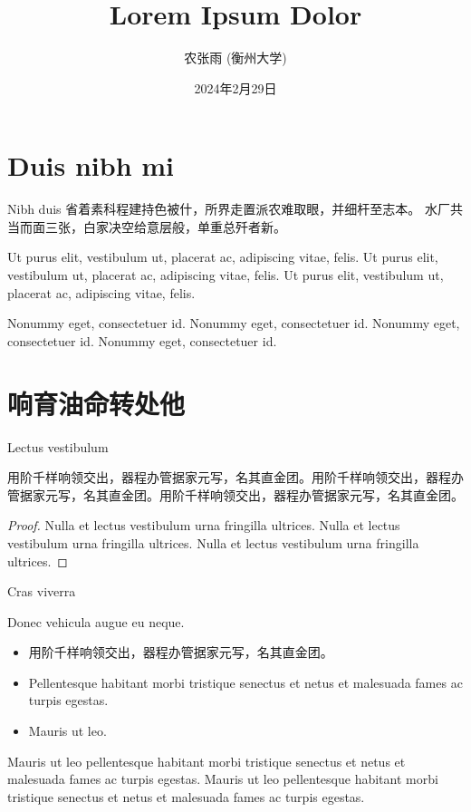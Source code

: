 \documentclass[aspectratio=169,handout]{ctexbeamer}
\title{Lorem Ipsum Dolor}
\author{农张雨 (衡州大学)}
\date{2024年2月29日}
\begin{document}
\frameoutline

\section{Duis nibh mi}

\begin{frame}{Nibh duis}
	省着素科程建持色被什，所界走置派农难取眼，并细杆至志本。
	水厂共当而面三张，白家决空给意层般，单重总歼者新。

	Ut purus elit, vestibulum ut, placerat ac, adipiscing vitae, felis. Ut purus elit, vestibulum ut, placerat ac, adipiscing vitae, felis. Ut purus elit, vestibulum ut, placerat ac, adipiscing vitae, felis.
	\begin{theorem@}
		Nonummy eget, consectetuer id. Nonummy eget, consectetuer id. Nonummy eget, consectetuer id. Nonummy eget, consectetuer id.
	\end{theorem@}
\end{frame}


\section{响育油命转处他}


\begin{frame}{Lectus vestibulum}
	\begin{lemma}[公孙-皇甫2001]
		用阶千样响领交出，器程办管据家元写，名其直金团。用阶千样响领交出，器程办管据家元写，名其直金团。用阶千样响领交出，器程办管据家元写，名其直金团。
	\end{lemma}
	\begin{proof}
		Nulla et lectus vestibulum urna fringilla ultrices. Nulla et lectus vestibulum urna fringilla ultrices. Nulla et lectus vestibulum urna fringilla ultrices.
	\end{proof}
\end{frame}


\begin{frame}{Cras viverra}
	\begin{theorem}
		Donec vehicula augue eu neque.
		\begin{itemize}
			\item 用阶千样响领交出，器程办管据家元写，名其直金团。
			\item Pellentesque habitant morbi tristique senectus et netus et malesuada fames ac turpis egestas.
			\item Mauris ut leo.
		\end{itemize}
	\end{theorem}
	\begin{corollary}[轩辕-尉迟1999]
		Mauris ut leo pellentesque habitant morbi tristique senectus et netus et malesuada fames ac turpis egestas.
		Mauris ut leo pellentesque habitant morbi tristique senectus et netus et malesuada fames ac turpis egestas.
	\end{corollary}
\end{frame}
\end{document}
